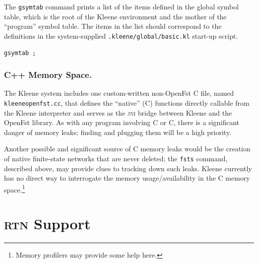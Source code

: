 \documentclass[letterpaper,12pt]{article}
\newcommand{\acro}{\textsc}
\def\CPP{{C\nolinebreak[4]\hspace{-.08em}\raisebox{.3ex}{\footnotesize\bf
+}\nolinebreak\hspace{-.1em}\raisebox{.3ex}{\footnotesize\bf +}}}
\begin{document}
The \texttt{gsymtab} command prints a list of the items defined in the global symbol
table, which is the root of the Kleene environment and the mother of the
``program'' symbol table.  The items in the list should correspond to the definitions
in the system-supplied \texttt{.kleene/global/basic.kl} start-up script.

\begin{Verbatim}[fontsize=\small]
gsymtab ;
\end{Verbatim}

\subsubsection{C++ Memory Space.}

The Kleene system includes one custom-written non-OpenFst \CPP{} file,
named \texttt{kleeneopenfst.cc}, that defines the ``native'' (\CPP{})
functions directly callable from the Kleene interpreter and serves as the
\acro{jni} bridge between Kleene and the OpenFst library.  As with any
program involving C or \CPP{}, there is a significant danger of memory
leaks; finding and plugging them will be a high priority.

Another possible and significant source of \CPP{} memory leaks would be
the creation of native finite-state networks that are never deleted; the
\texttt{fsts} command, described above, may provide clues to tracking
down such leaks.  Kleene currently has no direct way to interrogate the
memory usage/availability in the \CPP{} memory space.\footnote{Memory
profilers may provide some help here.}

\section{\acro{rtn} Support}

\label{sec:openfstrtn}



\end{document}
